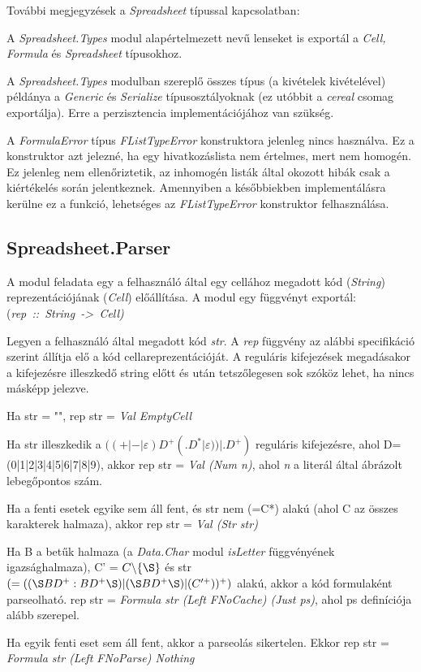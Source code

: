 További megjegyzések a \textit{Spreadsheet} típussal kapcsolatban:
\begin{compactenum}
	\item A \textit{Spreadsheet.Types} modul alapértelmezett nevű lenseket is exportál a \textit{Cell, Formula} és \textit{Spreadsheet} típusokhoz.
	\item A \textit{Spreadsheet.Types} modulban szereplő összes típus (a kivételek kivételével) példánya a \textit{Generic} és \textit{Serialize} típusosztályoknak (ez utóbbit a \textit{cereal} csomag exportálja). Erre a perzisztencia implementációjához van szükség.
	\item A \textit{FormulaError} típus \textit{FListTypeError} konstruktora jelenleg nincs használva. Ez a konstruktor azt jelezné, ha egy hivatkozáslista nem értelmes, mert nem homogén. Ez jelenleg nem ellenőriztetik, az inhomogén listák által okozott hibák csak a kiértékelés során jelentkeznek. Amennyiben a későbbiekben implementálásra kerülne ez a funkció, lehetséges az \textit{FListTypeError} konstruktor felhasználása.
\end{compactenum} 

\subsection{Spreadsheet.Parser}

A modul feladata egy a felhasználó által egy cellához megadott kód (\textit{String}) reprezentációjának (\textit{Cell}) előállítása. A modul egy függvényt exportál: \mbox{(\textit{rep :: String -> Cell)}}

Legyen a felhasználó által megadott kód \textit{str}. A \textit{rep} függvény az alábbi specifikáció szerint állítja elő a kód cellareprezentációját. A reguláris kifejezések megadásakor a kifejezésre illeszkedő string előtt és után tetszőlegesen sok szóköz lehet, ha nincs másképp jelezve.

\begin{compactenum}
	\item Ha str = "", rep str = \textit{Val EmptyCell}
	\item Ha str illeszkedik a $((+|-|\varepsilon)D^+(.D^*|\varepsilon))|.D^+)$ reguláris kifejezésre, ahol D=(0|1|2|3|4|5|6|7|8|9), akkor rep str = \textit{Val (Num n)}, ahol \textit{n} a literál által ábrázolt lebegőpontos szám. 
	\item Ha a fenti esetek egyike sem áll fent, és str nem (=C*) alakú (ahol C az összes karakterek halmaza), akkor rep str = \textit{Val (Str str)}
	\item Ha B a betűk halmaza (a \textit{Data.Char} modul \textit{isLetter} függvényének igazsághalmaza), C' = $C \backslash \{\S\}$ és str $(=((\S  BD^+:BD^+\S )|(\S BD^+\S )|(C'^+))^+)$ alakú, akkor a kód formulaként parseolható. rep str = \textit{Formula str (Left FNoCache) (Just ps)}, ahol ps definíciója alább szerepel.
	\item Ha egyik fenti eset sem áll fent, akkor a parseolás sikertelen. Ekkor rep str = \textit{Formula str (Left FNoParse) Nothing}
\end{compactenum}

